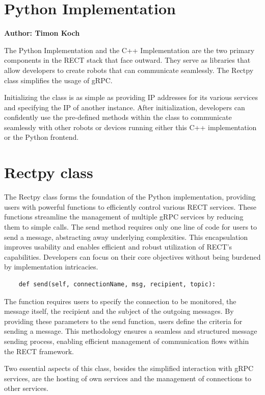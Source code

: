 \section{Python Implementation}
\textbf{Author: Timon Koch}

The Python Implementation and the C++ Implementation are the two primary components in the RECT stack that face outward. They serve as libraries that allow developers to create robots that can communicate seamlessly. The Rectpy class simplifies the usage of gRPC.

Initializing the class is as simple as providing IP addresses for its various services and specifying the IP of another instance. After initialization, developers can confidently use the pre-defined methods within the class to communicate seamlessly with other robots or devices running either this C++ implementation or the Python frontend.

\section{Rectpy class}
The Rectpy class forms the foundation of the Python implementation, providing users with powerful functions to efficiently control various RECT services. These functions streamline the management of multiple gRPC services by reducing them to simple calls. The send method requires only one line of code for users to send a message, abstracting away underlying complexities. This encapsulation improves usability and enables efficient and robust utilization of RECT's capabilities. Developers can focus on their core objectives without being burdened by implementation intricacies.

\begin{verbatim}
	def send(self, connectionName, msg, recipient, topic):
\end{verbatim}

The function requires users to specify the connection to be monitored, the message itself, the recipient and the subject of the outgoing messages. By providing these parameters to the send function, users define the criteria for sending a message. This methodology ensures a seamless and structured message sending process, enabling efficient management of communication flows within the RECT framework.

Two essential aspects of this class, besides the simplified interaction with gRPC services, are the hosting of own services and the management of connections to other services.

